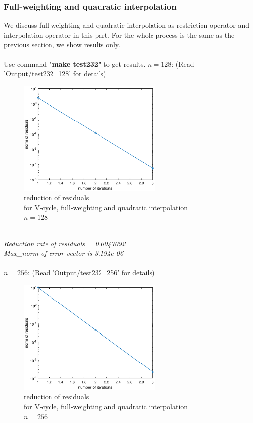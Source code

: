 \documentclass[a4paper,twocolumn]{article}
\theoremstyle{definition}
\begin{document}
\subsubsection{Full-weighting and quadratic interpolation}
We discuss full-weighting and quadratic interpolation as restriction operator and interpolation operator in this part. For the whole process is the same as the previous section, we show results only. \\\\
Use command \textbf{"make test232"} to get results. 
\newpage
\noindent $n=128$: (Read 'Output/test232\_128' for details)
\begin{figure}[!htp]   
	\centering
	\includegraphics[width=7cm]{Pictures/F232_1.eps}
	\caption{reduction of residuals \\for V-cycle, full-weighting and quadratic interpolation\\ $n = 128$}
\end{figure}\\
\emph{Reduction rate of residuals = 0.0047092}\\
\emph{Max\_norm of error vector is 3.194e-06}\\\\
$n=256$: (Read 'Output/test232\_256' for details)
\begin{figure}[!htp]   
	\centering
	\includegraphics[width=7cm]{Pictures/F232_2.eps}
	\caption{reduction of residuals \\for V-cycle, full-weighting and quadratic interpolation\\ $n = 256$}
\end{figure}\\
\end{document}

